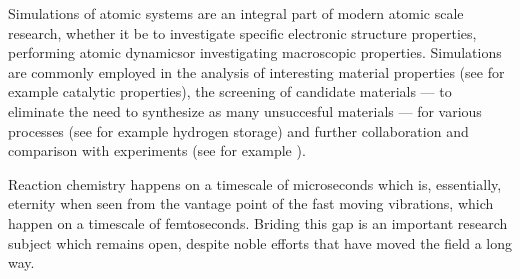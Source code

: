 Simulations of atomic systems are an integral part of modern atomic scale research, whether it be to investigate specific electronic structure properties\citemiss, performing atomic dynamics\citemiss or investigating macroscopic properties\citemiss.
Simulations are commonly employed in the analysis of interesting material properties (see for example catalytic properties\citemiss), the screening of candidate materials --- to eliminate the need to synthesize as many unsuccesful materials --- for various processes (see for example hydrogen storage\citemiss) and further collaboration and comparison with experiments (see for example \citemiss).

Reaction chemistry happens on a timescale of microseconds which is, essentially, eternity when seen from the vantage point of the fast moving vibrations, which happen on a timescale of femtoseconds.
Briding this gap is an important research subject which remains open, despite noble efforts that have moved the field a long way\citemiss.



%




